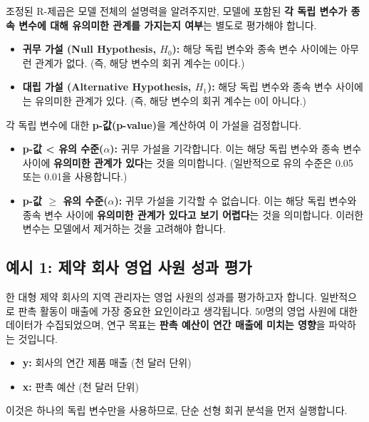 \documentclass[11pt,a4paper]{article}
\theoremstyle{definition}
\begin{document}
\begin{tcolorbox}[title=\textbf{변수의 유의성 검정 (Testing the Significance)}]
조정된 R-제곱은 모델 전체의 설명력을 알려주지만, 모델에 포함된 \textbf{각 독립 변수가 종속 변수에 대해 유의미한 관계를 가지는지 여부}는 별도로 평가해야 합니다.

\begin{itemize}
    \item \textbf{귀무 가설 (Null Hypothesis, $H_0$):} 해당 독립 변수와 종속 변수 사이에는 아무런 관계가 없다. (즉, 해당 변수의 회귀 계수는 0이다.)
    \item \textbf{대립 가설 (Alternative Hypothesis, $H_1$):} 해당 독립 변수와 종속 변수 사이에는 유의미한 관계가 있다. (즉, 해당 변수의 회귀 계수는 0이 아니다.)
\end{itemize}
각 독립 변수에 대한 \textbf{p-값(p-value)}을 계산하여 이 가설을 검정합니다.
\begin{itemize}
    \item \textbf{p-값 < 유의 수준($\alpha$):} 귀무 가설을 기각합니다. 이는 해당 독립 변수와 종속 변수 사이에 \textbf{유의미한 관계가 있다}는 것을 의미합니다. (일반적으로 유의 수준은 0.05 또는 0.01을 사용합니다.)
    \item \textbf{p-값 $\ge$ 유의 수준($\alpha$):} 귀무 가설을 기각할 수 없습니다. 이는 해당 독립 변수와 종속 변수 사이에 \textbf{유의미한 관계가 있다고 보기 어렵다}는 것을 의미합니다. 이러한 변수는 모델에서 제거하는 것을 고려해야 합니다.
\end{itemize}
\end{tcolorbox}

\newpage
\subsection{예시 1: 제약 회사 영업 사원 성과 평가}

\begin{examplebox}[title=\textbf{문제 상황}]
한 대형 제약 회사의 지역 관리자는 영업 사원의 성과를 평가하고자 합니다. 일반적으로 판촉 활동이 매출에 가장 중요한 요인이라고 생각됩니다. 50명의 영업 사원에 대한 데이터가 수집되었으며, 연구 목표는 \textbf{판촉 예산이 연간 매출에 미치는 영향}을 파악하는 것입니다.

\begin{itemize}
    \item \textbf{y:} 회사의 연간 제품 매출 (천 달러 단위)
    \item \textbf{x:} 판촉 예산 (천 달러 단위)
\end{itemize}
이것은 하나의 독립 변수만을 사용하므로, 단순 선형 회귀 분석을 먼저 실행합니다.
\end{examplebox}
\end{document}
